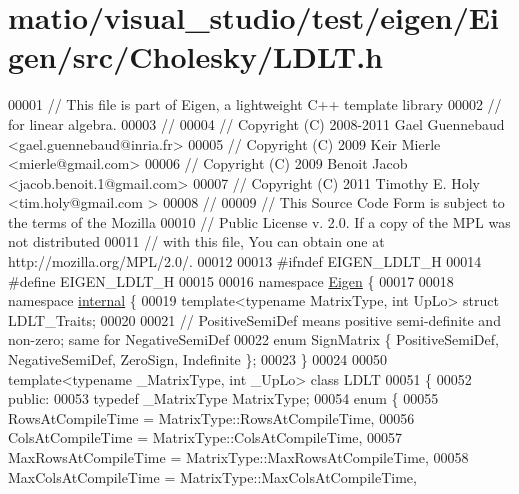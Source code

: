 \hypertarget{matio_2visual__studio_2test_2eigen_2_eigen_2src_2_cholesky_2_l_d_l_t_8h_source}{}\section{matio/visual\+\_\+studio/test/eigen/\+Eigen/src/\+Cholesky/\+L\+D\+LT.h}
\label{matio_2visual__studio_2test_2eigen_2_eigen_2src_2_cholesky_2_l_d_l_t_8h_source}

\begin{DoxyCode}
00001 \textcolor{comment}{// This file is part of Eigen, a lightweight C++ template library}
00002 \textcolor{comment}{// for linear algebra.}
00003 \textcolor{comment}{//}
00004 \textcolor{comment}{// Copyright (C) 2008-2011 Gael Guennebaud <gael.guennebaud@inria.fr>}
00005 \textcolor{comment}{// Copyright (C) 2009 Keir Mierle <mierle@gmail.com>}
00006 \textcolor{comment}{// Copyright (C) 2009 Benoit Jacob <jacob.benoit.1@gmail.com>}
00007 \textcolor{comment}{// Copyright (C) 2011 Timothy E. Holy <tim.holy@gmail.com >}
00008 \textcolor{comment}{//}
00009 \textcolor{comment}{// This Source Code Form is subject to the terms of the Mozilla}
00010 \textcolor{comment}{// Public License v. 2.0. If a copy of the MPL was not distributed}
00011 \textcolor{comment}{// with this file, You can obtain one at http://mozilla.org/MPL/2.0/.}
00012 
00013 \textcolor{preprocessor}{#ifndef EIGEN\_LDLT\_H}
00014 \textcolor{preprocessor}{#define EIGEN\_LDLT\_H}
00015 
00016 \textcolor{keyword}{namespace }\hyperlink{namespace_eigen}{Eigen} \{
00017 
00018 \textcolor{keyword}{namespace }\hyperlink{namespaceinternal}{internal} \{
00019   \textcolor{keyword}{template}<\textcolor{keyword}{typename} MatrixType, \textcolor{keywordtype}{int} UpLo> \textcolor{keyword}{struct }LDLT\_Traits;
00020 
00021   \textcolor{comment}{// PositiveSemiDef means positive semi-definite and non-zero; same for NegativeSemiDef}
00022   \textcolor{keyword}{enum} SignMatrix \{ PositiveSemiDef, NegativeSemiDef, ZeroSign, Indefinite \};
00023 \}
00024 
00050 \textcolor{keyword}{template}<\textcolor{keyword}{typename} \_MatrixType, \textcolor{keywordtype}{int} \_UpLo> \textcolor{keyword}{class }LDLT
00051 \{
00052   \textcolor{keyword}{public}:
00053     \textcolor{keyword}{typedef} \_MatrixType MatrixType;
00054     \textcolor{keyword}{enum} \{
00055       RowsAtCompileTime = MatrixType::RowsAtCompileTime,
00056       ColsAtCompileTime = MatrixType::ColsAtCompileTime,
00057       MaxRowsAtCompileTime = MatrixType::MaxRowsAtCompileTime,
00058       MaxColsAtCompileTime = MatrixType::MaxColsAtCompileTime,

\end{DoxyCode}
